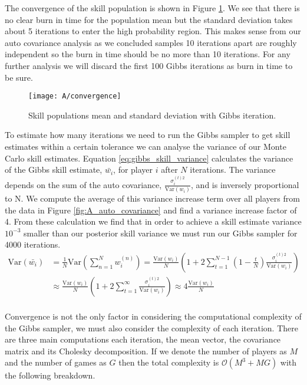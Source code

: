 \documentclass[11pt]{article}
\begin{document}
The convergence of the skill population is shown in Figure \ref{fig:A_convergence}. We see that there is no clear burn in time for the population mean but the standard deviation takes about 5 iterations to enter the high probability region. This makes sense from our auto covariance analysis as we concluded samples 10 iterations apart are roughly independent so the burn in time should be no more than 10 iterations. For any further analysis we will discard the first 100 Gibbs iterations as burn in time to be sure.

\begin{figure}[h]
    \centering
    \texttt{[image: A/convergence]} 
    \caption{Skill populations mean and standard deviation with Gibbs iteration.}
    \label{fig:A_convergence}
\end{figure}

To estimate how many iterations we need to run the Gibbs sampler to get skill estimates within a certain tolerance we can analyse the variance of our Monte Carlo skill estimates. Equation \ref{eq:gibbs_skill_variance} calculates the variance of the Gibbs skill estimate, $\bar{w_i}$, for player $i$ after $N$ iterations. The variance depends on the sum of the auto covariance, $\frac{\sigma_i^{(t)2}}{\text{Var}(w_i)}$, and is inversely proportional to N. We compute the average of this variance increase term over all players from the data in Figure \ref{fig:A_auto_covariance} and find a variance increase factor of 4. From these calculation we find that in order to achieve a skill estimate variance $10^{-3}$ smaller than our posterior skill variance we must run our Gibbs sampler for 4000 iterations.
\begin{equation}
    \begin{split}
    \text{Var}(\bar{w_i}) &= \frac{1}{N} \text{Var}(\sum_{n=1}^{N} w_i^{(n)}) = \frac{\text{Var}(w_i)}{N} (1 + 2 \sum_{t=1}^{N-1} (1-\frac{t}{N}) \frac{\sigma_i^{(t)2}}{\text{Var}(w_i)}) \\
     &\approx \frac{\text{Var}(w_i)}{N} (1 + 2 \sum_{t=1}^{\infty} \frac{\sigma_i^{(t)2}}{\text{Var}(w_i)}) \approx 4\frac{\text{Var}(w_i)}{N}\\
    \end{split}
    \label{eq:gibbs_skill_variance}
\end{equation}

Convergence is not the only factor in considering the computational complexity of the Gibbs sampler, we must also consider the complexity of each iteration. There are three main computations each iteration, the mean vector, the covariance matrix and its Cholesky decomposition. If we denote the number of players as $M$ and the number of games as $G$ then the total complexity is $\mathcal{O}(M^3 + MG)$ with the following breakdown.
\end{document}
